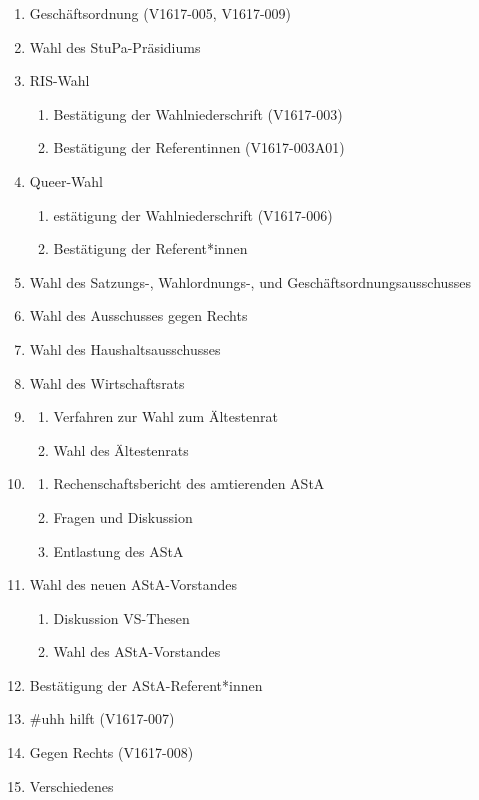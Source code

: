 \documentclass[ngerman,headheight=70pt]{scrartcl}
\begin{document}
    \begin{enumerate}[label={\textbf{Top \theenumi}},leftmargin=*]
        \item Geschäftsordnung (V1617-005, V1617-009)
        \item Wahl des StuPa-Präsidiums
        \item RIS-Wahl
            \begin{enumerate}
                \item Bestätigung der Wahlniederschrift (V1617-003)
                \item Bestätigung der Referentinnen (V1617-003A01)
            \end{enumerate}
        \item Queer-Wahl
            \begin{enumerate}
                \item estätigung der Wahlniederschrift (V1617-006)
                \item Bestätigung der Referent*innen
            \end{enumerate}
        \item Wahl des Satzungs-, Wahlordnungs-, und Geschäftsordnungsausschusses
        \item Wahl des Ausschusses gegen Rechts
        \item Wahl des Haushaltsausschusses
        \item Wahl des Wirtschaftsrats
        \item
            \begin{enumerate}
                \item Verfahren zur Wahl zum Ältestenrat
                \item Wahl des Ältestenrats
            \end{enumerate}
        \item
            \begin{enumerate}
                \item Rechenschaftsbericht des amtierenden AStA
                \item Fragen und Diskussion
                \item Entlastung des AStA
            \end{enumerate}
        \item Wahl des neuen AStA-Vorstandes
            \begin{enumerate}
                \item Diskussion VS-Thesen
                \item Wahl des AStA-Vorstandes
            \end{enumerate}
        \item Bestätigung der AStA-Referent*innen
        \item \#uhh hilft (V1617-007)
        \item Gegen Rechts (V1617-008)
        \item Verschiedenes
    \end{enumerate}
\end{document}

